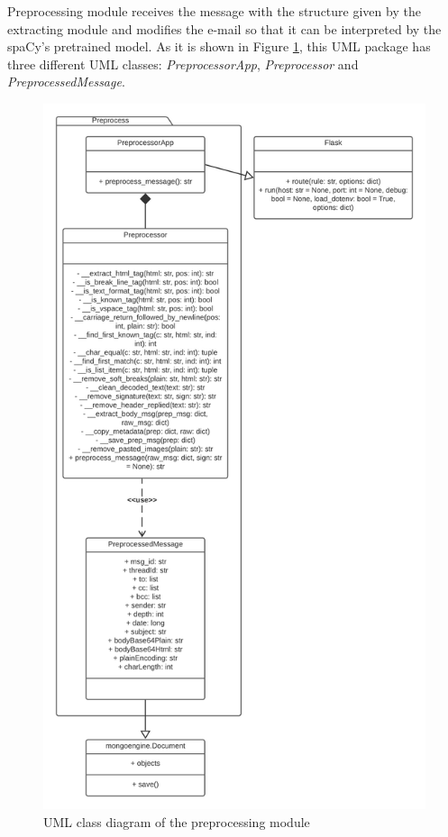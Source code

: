 Preprocessing module receives the message with the structure given by the extracting module and modifies the e-mail so that it can be interpreted by the spaCy's pretrained model. As it is shown in Figure \ref{fig:umlprep}, this UML package has three different UML classes: \textit{PreprocessorApp}, \textit{Preprocessor} and \textit{PreprocessedMessage}.

\begin{figure}[p]
	\centering%
	\centerline{\includegraphics[height=0.85\paperheight]{Imagenes/Bitmap/preprocessUML.png}}%
	\caption{UML class diagram of the preprocessing module}%
	\label{fig:umlprep}
\end{figure}


